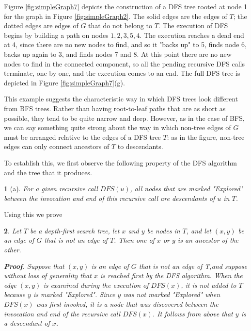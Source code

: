 \documentclass[12pt,a4paper]{book}
\newtheorem{lemma}{}[chapter]
\begin{document}
Figure \ref{fig:simpleGraph7} depicts the construction of a DFS tree rooted at node 1 for the graph in Figure \ref{fig:simpleGraph2}. The solid edges are the edges of $T$; the dotted edges are edges of $G$ that do not belong to $T$. The execution of DFS begins by building a path on nodes $1, 2, 3, 5, 4$. The execution reaches a dead end at 4, since there are no new nodes to find, and so it "backs up" to 5, finds node 6, backs up again to 3, and finds nodes 7 and 8. At this point there are no new nodes to find in the connected component, so all the pending recursive DFS calls terminate, one by one, and the execution comes to an end. The full DFS tree is depicted in Figure \ref{fig:simpleGraph7}(g).\par
This example suggests the characteristic way in which DFS trees look different from BFS trees. Rather than having root-to-leaf paths that are as short as possible, they tend to be quite narrow and deep. However, as in the case of BFS, we can say something quite strong about the way in which non-tree edges of $G$ must be arranged relative to the edges of a DFS tree $T$: as in the figure, non-tree edges can only connect ancestors of $T$ to descendants.\par
To establish this, we first observe the following property of the DFS algorithm and the tree that it produces.
\begin{lemma}[a]
For a given recursive call $DFS(u)$, all nodes that are marked "Explored" between the invocation and end of this recursive call are descendants of $u$ in $T$.
\end{lemma}
Using this we prove 
\begin{lemma}
Let $T$ be a depth-first search tree, let $x$ and $y$ be nodes in $T$, and let $(x, y)$ be an edge of $G$ that is not an edge of $T$. Then one of $x$ or $y$ is an ancestor of the other.\par
\textbf{Proof}. Suppose that $(x,y)$ is an edge of $G$ that is not an edge of T,and suppose without loss of generality that $x$ is reached first by the DFS algorithm. When the edge $(x, y)$ is examined during the execution of $DFS(x)$, it is not added to $T$ because $y$ is marked "Explored". Since $y$ was not marked "Explored" when $DFS(x)$ was first invoked, it is a node that was discovered between the invocation and end of the recursive call $DFS(x)$. It follows from  above that $y$ is a descendant of $x$.
\end{lemma}
\end{document}
